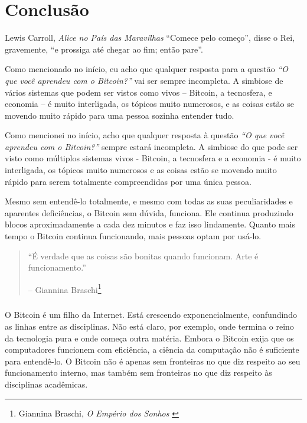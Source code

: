 
\label{ch:conclusion}

\chapter*{Conclusão}

\begin{chapquote}{Lewis Carroll, \textit{Alice no País das Maravílhas}}
\enquote{Comece pelo começo}, disse o Rei, gravemente, \enquote{e prossiga até chegar ao fim; então pare}.

\end{chapquote}
Como mencionado no início, eu acho que qualquer resposta para a questão 
\textit{“O que você aprendeu com o Bitcoin?”} vai ser sempre incompleta. 
A simbiose de vários sistemas que podem ser vistos como vivos -- Bitcoin, 
a tecnosfera, e economia -- é muito interligada, os tópicos muito numerosos, e 
as coisas estão se movendo muito rápido para uma pessoa sozinha entender tudo.

Como mencionei no início, acho que qualquer resposta à questão \textit{“O que você aprendeu com o Bitcoin?”} sempre estará incompleta. A simbiose do que pode ser visto como múltiplos sistemas vivos - Bitcoin, a tecnosfera e a economia - é muito interligada, os tópicos muito numerosos e as coisas estão se movendo muito rápido para serem totalmente compreendidas por uma única pessoa.

Mesmo sem entendê-lo totalmente, e mesmo com todas as suas peculiaridades e aparentes deficiências, o Bitcoin sem dúvida, funciona. Ele continua produzindo blocos aproximadamente a cada dez minutos e faz isso lindamente. Quanto mais tempo o Bitcoin continua funcionando, mais pessoas optam por usá-lo.

\begin{quotation}\begin{samepage}
\enquote{É verdade que as coisas são bonitas quando funcionam. Arte é funcionamento.}
\begin{flushright} -- Giannina Braschi\footnote{Giannina Braschi, \textit{O Empério dos Sonhos} \cite{braschi2011empire}}
\end{flushright}\end{samepage}\end{quotation}

\paragraph{}
O Bitcoin é um filho da Internet. Está crescendo exponencialmente, confundindo as linhas entre as disciplinas. Não está claro, por exemplo, onde termina o reino da tecnologia pura e onde começa outra matéria. Embora o Bitcoin exija que os computadores funcionem com eficiência, a ciência da computação não é suficiente para entendê-lo. O Bitcoin não é apenas sem fronteiras no que diz respeito ao seu funcionamento interno, mas também sem fronteiras no que diz respeito às disciplinas acadêmicas.

